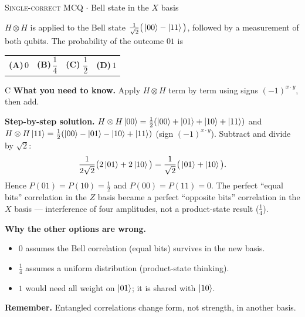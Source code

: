 \documentclass[11pt,a4paper]{article}
\newcommand{\optlabel}[1]{\textbf{(#1)}}
\newcommand{\correctlabel}[1]{\textcolor{okgreen}{\textbf{(#1)}\,\ding{51}}}
\newenvironment{qitem}[1]{\begin{list}{}{\setlength{\leftmargin}{3.3em}\setlength{\labelwidth}{3.1em}%
  \setlength{\labelsep}{0.2em}\setlength{\topsep}{3pt}\setlength{\parsep}{3pt}}\item[\textbf{Q.#1}\hfill]}{\end{list}}
\newcommand{\qsep}{\par\vspace{2pt}{\color{black!15}\hrule}\vspace{4pt}}
\newcommand{\qmeta}[2]{{\footnotesize\color{black!60}\textsc{#1} \;$\cdot$\; #2}\par}
\begin{document}
\begin{qitem}{33}
\qmeta{Single-correct MCQ}{Bell state in the $X$ basis}
$H\otimes H$ is applied to the Bell state $\frac{1}{\sqrt2}\big(\ket{00} - \ket{11}\big)$, followed by a measurement of both
qubits. The probability of the outcome $01$ is
\par\smallskip\noindent\begin{tabularx}{\linewidth}{@{}*{4}{L}@{}}
\optlabel{A}\,$0$ & \optlabel{B}\,$\dfrac14$ & \correctlabel{C}\,$\dfrac12$ & \optlabel{D}\,$1$
\end{tabularx}
\end{qitem}
\begin{solbox}{C}
\textbf{\color{brand}What you need to know.} Apply $H\otimes H$ term by term using signs $(-1)^{x\cdot y}$, then add.

\textbf{\color{brand}Step-by-step solution.} $H\otimes H\ket{00} = \frac12(\ket{00} + \ket{01} + \ket{10} + \ket{11})$ and
$H\otimes H\ket{11} = \frac12(\ket{00} - \ket{01} - \ket{10} + \ket{11})$ (sign $(-1)^{x\cdot y}$). Subtract and divide by $\sqrt2$:
\[ \frac{1}{2\sqrt2}\big(2\ket{01} + 2\ket{10}\big) = \frac{1}{\sqrt2}\big(\ket{01} + \ket{10}\big). \]
Hence $P(01) = P(10) = \frac12$ and $P(00) = P(11) = 0$. The perfect ``equal bits'' correlation in the $Z$ basis became a
perfect ``opposite bits'' correlation in the $X$ basis --- interference of four amplitudes, not a product-state result
($\frac14$).

\textbf{\color{brand}Why the other options are wrong.}
\begin{itemize}[leftmargin=2.4em, itemsep=1pt, topsep=2pt]
\item[\textbf{(A)}] $0$ assumes the Bell correlation (equal bits) survives in the new basis.
\item[\textbf{(B)}] $\frac14$ assumes a uniform distribution (product-state thinking).
\item[\textbf{(D)}] $1$ would need all weight on $\ket{01}$; it is shared with $\ket{10}$.
\end{itemize}
\textbf{\color{brand}Remember.} Entangled correlations change form, not strength, in another basis.
\end{solbox}
\qsep
\end{document}
